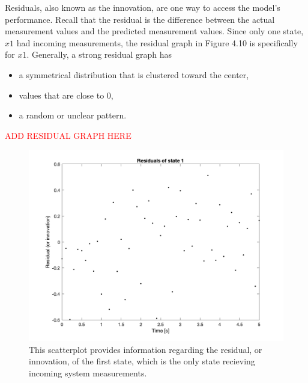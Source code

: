 \noindent Residuals, also known as the innovation, are one way to access the model's performance. Recall that the residual is the difference between the actual measurement values and the predicted measurement values. Since only one state, $x1$ had incoming measurements, the residual graph in Figure 4.10 is specifically for $x1$. Generally, a strong residual graph has

\begin{itemize}
\item a symmetrical distribution that is clustered toward the center,
\item values that are close to 0,
\item a random or unclear pattern.
\end{itemize}


\textcolor{red}{ADD RESIDUAL GRAPH HERE}
\begin{figure}[h]
    \centering
    \includegraphics[scale = 0.6]{Meskin_residuals_state1.png}
    \caption{This scatterplot provides information regarding the residual, or innovation, of the first state, which is the only state recieving incoming system measurements.}
\end{figure}














